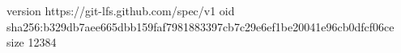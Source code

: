 version https://git-lfs.github.com/spec/v1
oid sha256:b329db7aee665dbb159faf7981883397cb7c29e6ef1be20041e96cb0dfcf06ce
size 12384
